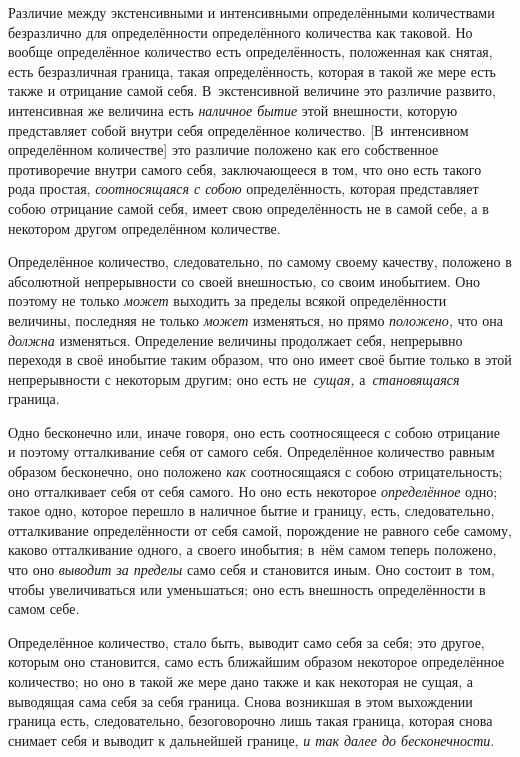 Различие между экстенсивными и интенсивными определёнными количествами
безразлично для определённости определённого количества как таковой. Но вообще
определённое количество есть определённость, положенная как снятая, есть
безразличная граница, такая определённость, которая в такой же мере есть также
и отрицание самой себя. В~экстенсивной величине это различие развито,
интенсивная же величина есть {\em наличное бытие} этой внешности, которую
представляет собой внутри себя определённое количество. [В~интенсивном
определённом количестве] это различие положено как его собственное противоречие
внутри самого себя, заключающееся в том, что оно есть такого рода простая,
{\em соотносящаяся с собою} определённость, которая представляет собою
отрицание самой себя, имеет свою определённость не в самой себе, а в некотором другом
определённом количестве.

Определённое количество, следовательно, по самому своему качеству, положено
в абсолютной непрерывности со своей внешностью, со своим инобытием. Оно поэтому
не только {\em может} выходить за пределы всякой определённости величины,
последняя не только {\em может} изменяться, но прямо {\em положено,} что она
{\em должна} изменяться. Определение величины продолжает себя,
непрерывно переходя в своё инобытие таким образом, что оно имеет своё бытие
только в этой непрерывности с некоторым другим; оно есть не~{\em сущая,}
а~{\em становящаяся} граница.

Одно бесконечно или, иначе говоря, оно есть соотносящееся с собою отрицание и
поэтому отталкивание себя от самого себя. Определённое количество равным
образом бесконечно, оно положено {\em как} соотносящаяся с собою отрицательность; оно
отталкивает себя от себя самого. Но оно есть некоторое {\em определённое} одно;
такое одно, которое перешло в наличное бытие и границу, есть, следовательно,
отталкивание определённости от себя самой, порождение не равного себе самому,
каково отталкивание одного, а своего инобытия; в~нём самом теперь положено, что
оно {\em выводит за пределы} само себя и становится иным. Оно состоит в~том, чтобы
увеличиваться или уменьшаться; оно есть внешность определённости в самом себе.

Определённое количество, стало быть, выводит само себя за себя; это другое,
которым оно становится, само есть ближайшим образом некоторое определённое
количество; но оно в такой же мере дано также и как некоторая не сущая, а
выводящая сама себя за себя граница. Снова возникшая в этом выхождении граница
есть, следовательно, безоговорочно лишь такая граница, которая снова снимает
себя и выводит к дальнейшей границе, {\em и так далее до бесконечности}.


